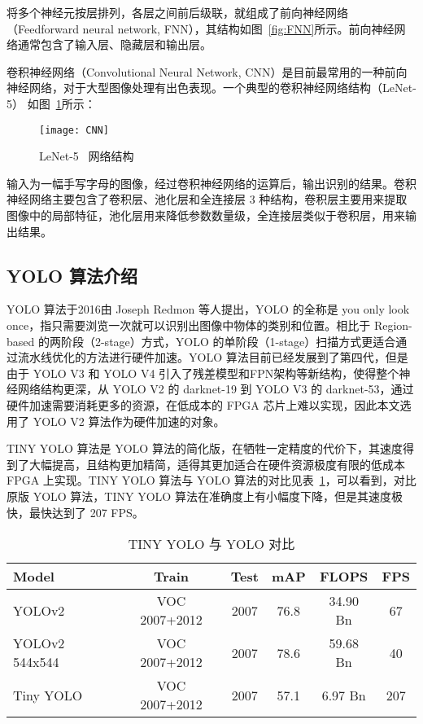 将多个神经元按层排列，各层之间前后级联，就组成了前向神经网络（Feedforward neural network, FNN），其结构如图~\ref{fig:FNN}所示。前向神经网络通常包含了输入层、隐藏层和输出层。

卷积神经网络（Convolutional Neural Network, CNN）是目前最常用的一种前向神经网络，对于大型图像处理有出色表现。一个典型的卷积神经网络结构（LeNet-5）\citep{lecun1998gradient} 如图~\ref{fig:CNN}所示：

\begin{figure}[!htbp]
    \centering
    \texttt{[image: CNN]}
    \caption{LeNet-5 \ 网络结构}
    \label{fig:CNN}
\end{figure}

输入为一幅手写字母的图像，经过卷积神经网络的运算后，输出识别的结果。卷积神经网络主要包含了卷积层、池化层和全连接层 3 种结构，卷积层主要用来提取图像中的局部特征，池化层用来降低参数数量级，全连接层类似于卷积层，用来输出结果。

\subsection{YOLO 算法介绍}

YOLO 算法\citep{redmon2016you}于2016由 Joseph Redmon 等人提出，YOLO 的全称是 you only look once，指只需要浏览一次就可以识别出图像中物体的类别和位置。相比于 Region-based 的两阶段（2-stage）方式，YOLO 的单阶段（1-stage）扫描方式更适合通过流水线优化的方法进行硬件加速。YOLO 算法目前已经发展到了第四代，但是由于 YOLO V3 和 YOLO V4 引入了残差模型和FPN架构等新结构，使得整个神经网络结构更深，从 YOLO V2 的 darknet-19\citep{redmon2017yolo9000} 到 YOLO V3 的 darknet-53\citep{redmon2018yolov3}，通过硬件加速需要消耗更多的资源，在低成本的 FPGA 芯片上难以实现，因此本文选用了 YOLO V2 算法作为硬件加速的对象。

TINY YOLO 算法是 YOLO 算法的简化版，在牺牲一定精度的代价下，其速度得到了大幅提高，且结构更加精简，适得其更加适合在硬件资源极度有限的低成本 FPGA 上实现。TINY YOLO 算法与 YOLO 算法的对比见表~\ref{tab:tiny}，可以看到，对比原版 YOLO 算法，TINY YOLO 算法在准确度上有小幅度下降，但是其速度极快，最快达到了 207 FPS。

\begin{table}[!htbp]
\caption{TINY YOLO 与 YOLO 对比}
\label{tab:tiny}
\centering
\footnotesize%
\setlength{\tabcolsep}{4pt}%
\renewcommand{\arraystretch}{1.2}%
\begin{tabular}{lccccc}
\toprule
Model & Train & Test & mAP & FLOPS & FPS \\
\midrule
YOLOv2 & VOC 2007+2012 & 2007 & 76.8 & 34.90 Bn & 67 \\
YOLOv2 544x544 & VOC 2007+2012 & 2007 & 78.6 & 59.68 Bn & 40 \\
Tiny YOLO & VOC 2007+2012 & 2007 & 57.1 & 6.97 Bn & 207 \\
\bottomrule
\end{tabular}
\end{table}

